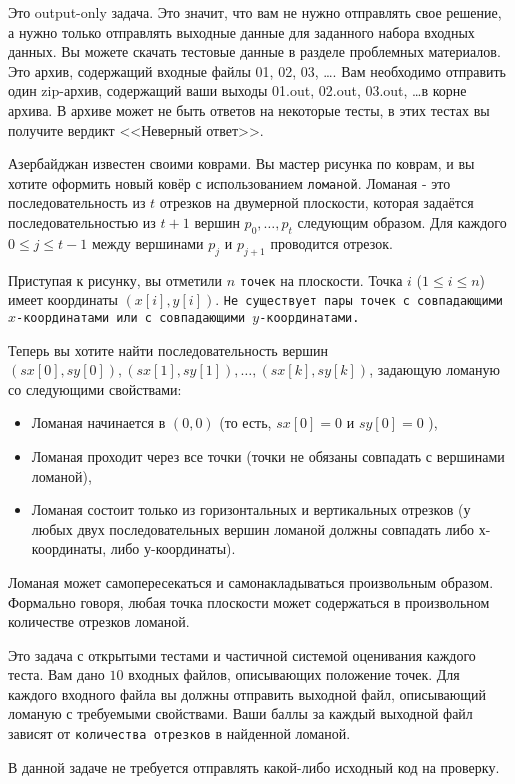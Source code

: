Это output-only задача. Это значит, что вам не нужно отправлять свое решение, а нужно только отправлять выходные данные для заданного набора входных данных. Вы можете скачать тестовые данные в разделе проблемных материалов. Это архив, содержащий входные файлы 01, 02, 03, \dots. Вам необходимо отправить один zip-архив, содержащий ваши выходы 01.out, 02.out, 03.out, \dots в корне архива. В архиве может не быть ответов на некоторые тесты, в этих тестах вы получите вердикт <<Неверный ответ>>.

Азербайджан известен своими коврами. Вы мастер рисунка по коврам, и вы хотите оформить новый ковёр с использованием \texttt{ломаной}. Ломаная - это последовательность из $t$ отрезков на двумерной плоскости, которая задаётся последовательностью из $t+1$ вершин $p_0, \ldots, p_t$ следующим образом. Для каждого $0 \leq j \leq t-1$ между вершинами $p_j$ и $p_{j+1}$ проводится отрезок.

Приступая к рисунку, вы отметили $n$ \texttt{точек} на плоскости. Точка $i$ ($1 \leq i \leq n$) имеет координаты $(x[i], y[i])$. \texttt{Не существует пары точек с совпадающими $x$-координатами или с совпадающими $y$-координатами.}

Теперь вы хотите найти последовательность вершин $(sx[0], sy[0]), (sx[1], sy[1]), \ldots, (sx[k], sy[k])$, задающую ломаную со следующими свойствами:

\begin{itemize}
\item Ломаная начинается в $(0,0)$ (то есть, $sx[0]=0$ и $sy[0]=0$ ),
\item Ломаная проходит через все точки (точки не обязаны совпадать с вершинами ломаной),
\item Ломаная состоит только из горизонтальных и вертикальных отрезков (у любых двух последовательных вершин ломаной должны совпадать либо х-координаты, либо у-координаты).
\end{itemize}

Ломаная может самопересекаться и самонакладываться произвольным образом. Формально говоря, любая точка плоскости может содержаться в произвольном количестве отрезков ломаной.

Это задача с открытыми тестами и частичной системой оценивания каждого теста. Вам дано $10$ входных файлов, описывающих положение точек. Для каждого входного файла вы должны отправить выходной файл, описывающий ломаную с требуемыми свойствами. Ваши баллы за каждый выходной файл зависят от \texttt{количества отрезков} в найденной ломаной.

В данной задаче не требуется отправлять какой-либо исходный код на проверку.